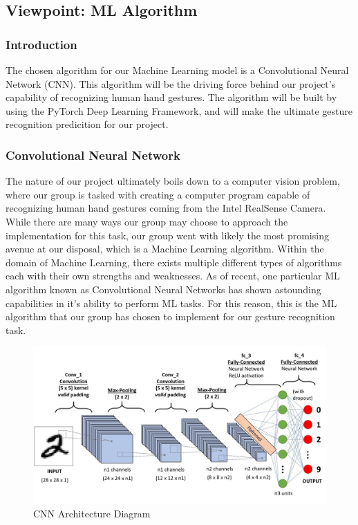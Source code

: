 \documentclass[onecolumn, draftclsnofoot,10pt, compsoc]{IEEEtran}
\begin{document}
\subsection{Viewpoint: ML Algorithm}
\subsubsection{Introduction}
The chosen algorithm for our Machine Learning model is a Convolutional Neural Network (CNN). This algorithm will be the driving force behind our project's capability of recognizing human hand gestures. The algorithm will be built by using the PyTorch Deep Learning Framework, and will make the ultimate gesture recognition predicition for our project.
\subsubsection{Convolutional Neural Network}
The nature of our project ultimately boils down to a computer vision problem, where our group is tasked with creating a computer program capable of recognizing human hand gestures coming from the Intel RealSense Camera. While there are many ways our group may choose to approach the implementation for this task, our group went with likely the most promising avenue at our disposal, which is a Machine Learning algorithm. Within the domain of Machine Learning, there exists multiple different types of algorithms each with their own strengths and weaknesses. As of recent, one particular ML algorithm known as Convolutional Neural Networks has shown astounding capabilities in it's ability to perform ML tasks\cite{first}. For this reason, this is the ML algorithm that our group has chosen to implement for our gesture recognition task. 
\\
\begin{figure}[ht]
    \centering
    \includegraphics[width=.8\textwidth]{CNN.jpeg}
    \caption{CNN Architecture Diagram\cite{first}}
    \label{fig:Figure 5}
\end{figure}
\end{document}
